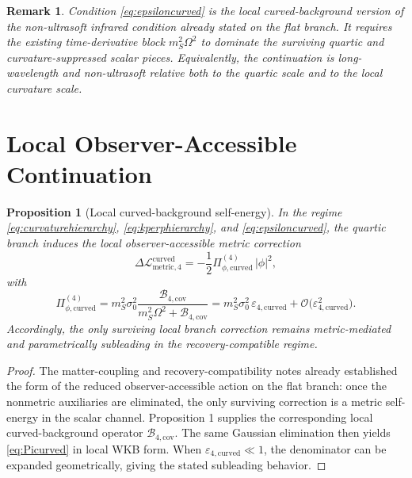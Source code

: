 \documentclass[11pt]{article}
\newtheorem{proposition}{Proposition}
\newtheorem{remark}{Remark}
\begin{document}
\begin{remark}
Condition \eqref{eq:epsiloncurved} is the local curved-background version of the non-ultrasoft infrared condition already stated on the flat branch. It requires the existing time-derivative block \(m_S^2\Omega^2\) to dominate the surviving quartic and curvature-suppressed scalar pieces. Equivalently, the continuation is long-wavelength and non-ultrasoft relative both to the quartic scale and to the local curvature scale.
\end{remark}

\section{Local Observer-Accessible Continuation}

\begin{proposition}[Local curved-background self-energy]
In the regime \eqref{eq:curvaturehierarchy}, \eqref{eq:kperphierarchy}, and \eqref{eq:epsiloncurved}, the quartic branch induces the local observer-accessible metric correction
\begin{equation}
\Delta\mathcal L_{\mathrm{metric},4}^{\mathrm{curved}}
=
-\frac{1}{2}\Pi_{\phi,\mathrm{curved}}^{(4)}\,|\phi|^2,
\label{eq:Deltaphi}
\end{equation}
with
\begin{equation}
\Pi_{\phi,\mathrm{curved}}^{(4)}
=
m_S^2\sigma_0^2
\frac{\mathcal B_{4,\mathrm{cov}}}
{m_S^2\Omega^2+\mathcal B_{4,\mathrm{cov}}}
=
m_S^2\sigma_0^2\,\varepsilon_{4,\mathrm{curved}}
+ \mathcal O\!\bigl(\varepsilon_{4,\mathrm{curved}}^2\bigr).
\label{eq:Picurved}
\end{equation}
Accordingly, the only surviving local branch correction remains metric-mediated and parametrically subleading in the recovery-compatible regime.
\end{proposition}

\begin{proof}
The matter-coupling and recovery-compatibility notes already established the form of the reduced observer-accessible action on the flat branch: once the nonmetric auxiliaries are eliminated, the only surviving correction is a metric self-energy in the scalar channel. Proposition 1 supplies the corresponding local curved-background operator \(\mathcal B_{4,\mathrm{cov}}\). The same Gaussian elimination then yields \eqref{eq:Picurved} in local WKB form. When \(\varepsilon_{4,\mathrm{curved}}\ll 1\), the denominator can be expanded geometrically, giving the stated subleading behavior.
\end{proof}
\end{document}
